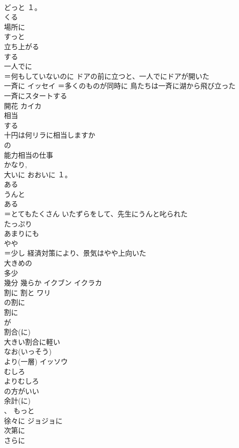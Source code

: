 \documentclass[8pt]{extreport}
\begin{document}
\begin{CJK}{UTF8}{min}
\\	どっと	１。
\\	くる
\\	場所に
\\	すっと	
\\	立ち上がる 
\\	する 
\\	一人でに	
\\	＝何もしていないのに ドアの前に立つと、一人でにドアが開いた
\\	一斉に	イッセイ ＝多くのものが同時に 鳥たちは一斉に湖から飛び立った 
\\	一斉にスタートする
\\	開花	カイカ 
\\	相当	
\\	する 
\\	十円は何リラに相当しますか 
\\	の
\\	能力相当の仕事 
\\	かなり, 
\\	大いに	おおいに １。
\\	ある 
\\	うんと	
\\	ある 
\\	＝とてもたくさん いたずらをして、先生にうんと叱られた
\\	たっぷり	
\\	あまりにも	
\\	やや	
\\	＝少し 経済対策により、景気はやや上向いた
\\	大きめの
\\	多少
\\	幾分 幾らか	イクブン イクラカ 
\\	割に 割と	ワリ 
\\	の割に
\\	割に
\\	が 
\\	割合(に)	
\\	大きい割合に軽い 
\\	なお(いっそう)	
\\	より(一層)	イッソウ 
\\	むしろ	
\\	よりむしろ
\\	の方がいい
\\	余計(に)	
\\	、 もっと
\\	徐々に	ジョジョに 
\\	次第に	
\\	さらに	

\end{CJK}
\end{document}
